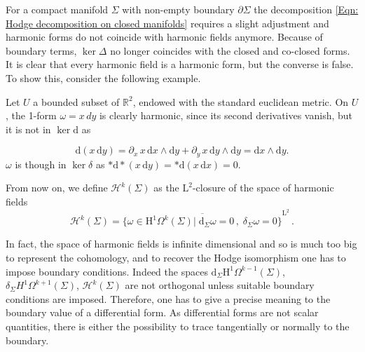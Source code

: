 For a compact manifold $\Sigma$ with non-empty boundary $\partial\Sigma$ the decomposition \eqref{Eqn: Hodge decomposition on closed manifolds} requires a slight adjustment and harmonic forms do not coincide with harmonic fields anymore.
Because of boundary terms, $\ker\Delta$ no longer coincides with the closed and co-closed forms. It is clear that every harmonic field is a harmonic form, but the converse is false. To show this, consider the following example.
\begin{Example}
	Let $U$ a bounded subset of $\mathbb{R}^2$, endowed with the standard euclidean metric. On $U$, the 1-form $\omega=x \,dy$ is clearly harmonic, since its second derivatives vanish, but it is not in $\ker \mathrm{d}$ as
	
	\[\mathrm{d}(x\, \mathrm{d}y) = \partial_x\, x\, \mathrm{d}x \wedge \mathrm{d}y + \partial_y\, x\, \mathrm{d}y \wedge \mathrm{d}y = \mathrm{d}x \wedge \mathrm{d}y.\] $\omega$ is though in $\ker \delta$ as $\ast \mathrm{d} \ast (x\, \mathrm{d}y) =\ast \mathrm{d}(x \,\mathrm{d}x) = 0$.
\end{Example}
\begin{Definition}
	From now on, we define $\mathcal{H}^k(\Sigma)$ as the $\mathrm{L}^2$-closure of the space of harmonic fields
	\begin{equation}\label{Eqn: harmonic fields}
		\mathcal{H}^k(\Sigma)=\overline{\lbrace\omega\in \mathrm{H}^1\Omega^k(\Sigma)|\;\mathrm{d}_\Sigma\omega=0\,,\;\delta_\Sigma\omega=0\rbrace}^{\mathrm{L}^2}\,.
	\end{equation}
\end{Definition}



In fact, the space of harmonic fields is infinite dimensional and so is much too big to represent the cohomology, and to recover the Hodge isomorphism one has to impose boundary conditions. Indeed the spaces $\mathrm{d}_\Sigma \mathrm{H}^1\Omega^{k-1}(\Sigma)$, $\delta_\Sigma H^{1}\Omega^{k+1}(\Sigma)$, $\mathcal{H}^k(\Sigma)$ are not orthogonal unless suitable boundary conditions are imposed.
Therefore, one has to give a precise meaning to the boundary value of a differential form. As differential forms are not scalar quantities, there is either the possibility to trace tangentially or normally to the boundary.

